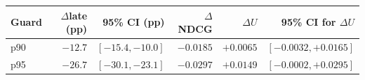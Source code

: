 \begin{tabular}{lrrrrr}
\toprule
Guard & $\Delta$late (pp) & 95\% CI (pp) & $\Delta$NDCG & $\Delta U$ & 95\% CI for $\Delta U$ \\
\midrule
p90 & $-12.7$ & $[-15.4, -10.0]$ & $-0.0185$ & $+0.0065$ & $[-0.0032, +0.0165]$ \\
p95 & $-26.7$ & $[-30.1, -23.1]$ & $-0.0297$ & $+0.0149$ & $[-0.0002, +0.0295]$ \\
\bottomrule
\end{tabular}
